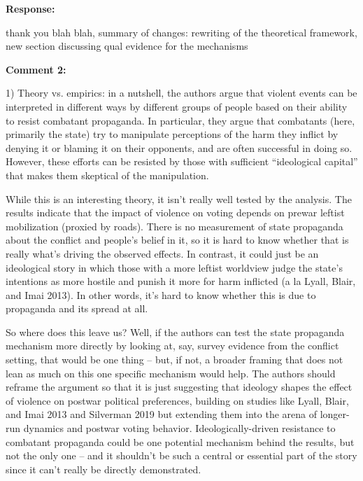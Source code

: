 \documentclass[12pt, a4paper, notitlepage]{article}
\begin{document}
\noindent\textbf{Response:} {}

thank you blah blah, summary of changes: rewriting of the theoretical framework, new section discussing qual evidence for the mechanisms

\vspace{15pt}
\noindent\textbf{Comment 2:}
\begin{displayquote}
1) Theory vs. empirics: in a nutshell, the authors argue that violent events can be interpreted in different ways by different groups of people based on their ability to resist combatant propaganda. In particular, they argue that combatants (here, primarily the state) try to manipulate perceptions of the harm they inflict by denying it or blaming it on their opponents, and are often successful in doing so. However, these efforts can be resisted by those with sufficient “ideological capital” that makes them skeptical of the manipulation.

While this is an interesting theory, it isn’t really well tested by the analysis. The results indicate that the impact of violence on voting depends on prewar leftist mobilization (proxied by roads). There is no measurement of state propaganda about the conflict and people’s belief in it, so it is hard to know whether that is really what’s driving the observed effects. In contrast, it could just be an ideological story in which those with a more leftist worldview judge the state’s intentions as more hostile and punish it more for harm inflicted (a la Lyall, Blair, and Imai 2013). In other words, it’s hard to know whether this is due to propaganda and its spread at all.

So where does this leave us? Well, if the authors can test the state propaganda mechanism more directly by looking at, say, survey evidence from the conflict setting, that would be one thing – but, if not, a broader framing that does not lean as much on this one specific mechanism would help. The authors should reframe the argument so that it is just suggesting that ideology shapes the effect of violence on postwar political preferences, building on studies like Lyall, Blair, and Imai 2013 and Silverman 2019 but extending them into the arena of longer-run dynamics and postwar voting behavior. Ideologically-driven resistance to combatant propaganda could be one potential mechanism behind the results, but not the only one – and it shouldn’t be such a central or essential part of the story since it can’t really be directly demonstrated.
\end{displayquote}
\end{document}
